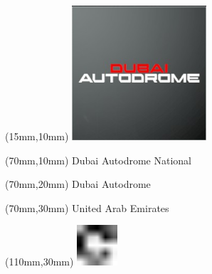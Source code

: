 \null\newpage
\begin{textblock*}{50mm}(15mm,10mm)%
\includegraphics[width=50mm]{LG/2015-05-20_00081.png}
\end{textblock*}
\begin{textblock*}{130mm}(70mm,10mm)%
{\fontsize{20}{20}\selectfont Dubai Autodrome National}\\
\end{textblock*}
\begin{textblock*}{120mm}(70mm,20mm)%
{\fontsize{16}{16}\selectfont Dubai Autodrome}\\
\end{textblock*}
\begin{textblock*}{120mm}(70mm,30mm)%
{\fontsize{12}{12}\selectfont United Arab Emirates}
\end{textblock*}
\begin{textblock*}{30mm}(110mm,30mm)%
\centering
\includegraphics[height=15mm]{icons/fa-rotate-right.pdf}
\end{textblock*}
